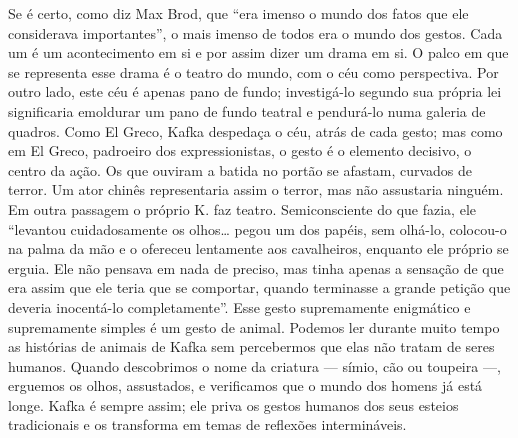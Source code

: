 Se é certo, como diz Max Brod, que ``era imenso o mundo dos fatos que
ele considerava importantes'', o mais imenso de todos era o mundo dos
gestos. Cada um é um acontecimento em si e por assim dizer um drama em
si. O palco em que se representa esse drama é o teatro do mundo, com o
céu como perspectiva. Por outro lado, este céu é apenas pano de fundo;
investigá-lo segundo sua própria lei significaria emoldurar um pano de
fundo teatral e pendurá-lo numa galeria de quadros. Como El Greco, Kafka
despedaça o céu, atrás de cada gesto; mas como em El Greco, padroeiro
dos expressionistas, o gesto é o elemento decisivo, o centro da ação. Os
que ouviram a batida no portão se afastam, curvados de terror. Um ator
chinês representaria assim o terror, mas não assustaria ninguém. Em
outra passagem o próprio K. faz teatro. Semiconsciente do que fazia, ele
``levantou cuidadosamente os olhos\ldots{} pegou um dos papéis, sem olhá-lo,
colocou-o na palma da mão e o ofereceu lentamente aos cavalheiros,
enquanto ele próprio se erguia. Ele não pensava em nada de preciso, mas
tinha apenas a sensação de que era assim que ele teria que se comportar,
quando terminasse a grande petição que deveria inocentá-lo
completamente''. Esse gesto supremamente enigmático e supremamente
simples é um gesto de animal. Podemos ler durante muito tempo as
histórias de animais de Kafka sem percebermos que elas não tratam de
seres humanos. Quando descobrimos o nome da criatura --- símio, cão ou
toupeira ---, erguemos os olhos, assustados, e verificamos que o mundo
dos homens já está longe. Kafka é sempre assim; ele priva os gestos
humanos dos seus esteios tradicionais e os transforma em temas de
reflexões intermináveis.

